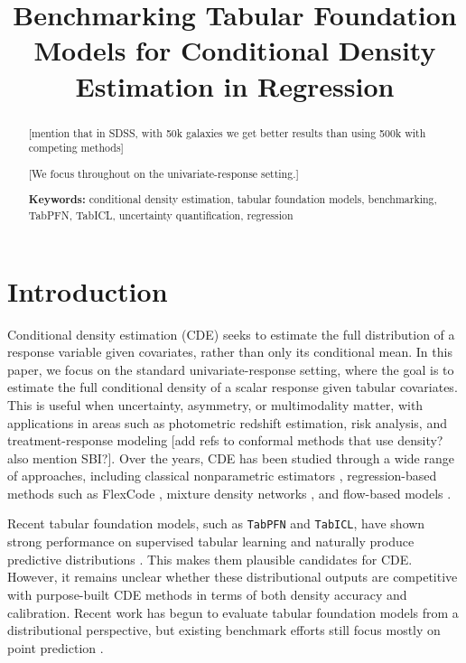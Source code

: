 \documentclass{article}
\title{Benchmarking Tabular Foundation Models for Conditional Density Estimation in Regression}
\author{
  Rafael Izbicki\thanks{Department of Statistics, Federal University of S\~{a}o Carlos (UFSCar), Brazil. \texttt{rafaelizb@gmail.com}
  \and
  Pedro L. C. Rodrigues\thanks{Inria Grenoble, France.}}
}
\newcommand{\method}[1]{\texttt{#1}}
\begin{document}
\maketitle

\begin{abstract}

[mention that in SDSS, with 50k galaxies we get better results than using 500k with competing methods]

[We focus throughout on the univariate-response setting.]

\textbf{Keywords:} conditional density estimation, tabular foundation models,
benchmarking, TabPFN, TabICL, uncertainty quantification, regression
\end{abstract}


\section{Introduction}
\label{sec:intro}

Conditional density estimation (CDE) seeks to estimate the full distribution of
a response variable given covariates, rather than only its conditional mean.
In this paper, we focus on the standard univariate-response setting, where the goal is to estimate the full conditional density of a scalar response given tabular covariates.
This is useful when uncertainty, asymmetry, or multimodality matter, with
applications in areas such as photometric redshift estimation, risk analysis,
and treatment-response modeling
\citep{schmidt2020evaluation,izbicki2017photo,koenker2005quantile,hothorn2014conditional} [add refs to conformal methods that use density? also mention SBI?].
Over the years, CDE has been studied through a wide range of approaches,
including classical nonparametric estimators \citep{rosenblatt1969conditional,hyndman1996estimating},
regression-based methods such as FlexCode \citep{izbicki2017converting},
mixture density networks \citep{bishop1994mixture}, and flow-based models
\citep{papamakarios2021normalizing}.

Recent tabular foundation models, such as \method{TabPFN} and \method{TabICL},
have shown strong performance on supervised tabular learning and naturally
produce predictive distributions
\citep{hollmann2025tabpfn,qu2025tabicl,mcelfresh2024neural}.
This makes them plausible candidates for CDE. However, it remains unclear
whether these distributional outputs are competitive with purpose-built CDE
methods in terms of both density accuracy and calibration. Recent work has begun
to evaluate tabular foundation models from a distributional perspective, but
existing benchmark efforts still focus mostly on point prediction
\citep{erickson2025tabarena,landsgesell2026distributional}.
\end{document}
